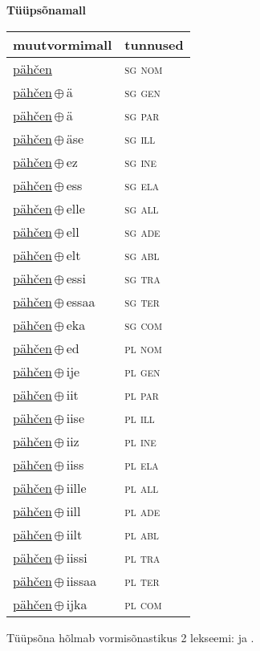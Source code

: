 

\vspace{3.5em}
\noindent \begin{minipage}{\textwidth}
\noindent \textbf{Tüüpsõnamall \,}\\

\begin{sideways}
\begin{tabular}{l l}
muutvormimall & tunnused \\
\hline
\underline{pähčen} & \textsc{ sg nom } \\
\underline{pähčen}\,$\oplus$\,ä & \textsc{ sg gen } \\
\underline{pähčen}\,$\oplus$\,ä & \textsc{ sg par } \\
\underline{pähčen}\,$\oplus$\,äse & \textsc{ sg ill } \\
\underline{pähčen}\,$\oplus$\,ez & \textsc{ sg ine } \\
\underline{pähčen}\,$\oplus$\,ess & \textsc{ sg ela } \\
\underline{pähčen}\,$\oplus$\,elle & \textsc{ sg all } \\
\underline{pähčen}\,$\oplus$\,ell & \textsc{ sg ade } \\
\underline{pähčen}\,$\oplus$\,elt & \textsc{ sg abl } \\
\underline{pähčen}\,$\oplus$\,essi & \textsc{ sg tra } \\
\underline{pähčen}\,$\oplus$\,essaa & \textsc{ sg ter } \\
\underline{pähčen}\,$\oplus$\,eka & \textsc{ sg com } \\
\underline{pähčen}\,$\oplus$\,ed & \textsc{ pl nom } \\
\underline{pähčen}\,$\oplus$\,ije & \textsc{ pl gen } \\
\underline{pähčen}\,$\oplus$\,iit & \textsc{ pl par } \\
\underline{pähčen}\,$\oplus$\,iise & \textsc{ pl ill } \\
\underline{pähčen}\,$\oplus$\,iiz & \textsc{ pl ine } \\
\underline{pähčen}\,$\oplus$\,iiss & \textsc{ pl ela } \\
\underline{pähčen}\,$\oplus$\,iille & \textsc{ pl all } \\
\underline{pähčen}\,$\oplus$\,iill & \textsc{ pl ade } \\
\underline{pähčen}\,$\oplus$\,iilt & \textsc{ pl abl } \\
\underline{pähčen}\,$\oplus$\,iissi & \textsc{ pl tra } \\
\underline{pähčen}\,$\oplus$\,iissaa & \textsc{ pl ter } \\
\underline{pähčen}\,$\oplus$\,ijka & \textsc{ pl com } \\
\end{tabular}
\end{sideways}
\label{tab:tüüpsõnamall-pähčen}

\end{minipage}

 
\vspace{1em}
\noindent Tüüpsõna hõlmab vormisõnastikus 2 lekseemi:  ja .
